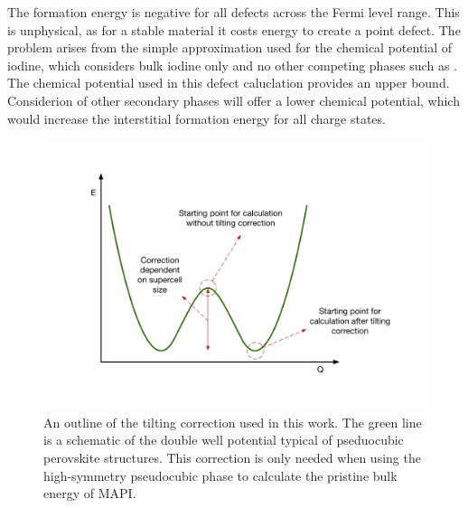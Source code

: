 The formation energy is negative for all defects across the Fermi level range. This is unphysical, as for a stable material it costs energy to create a point defect. The problem arises from the simple approximation used for the chemical potential of iodine, which considers bulk iodine only and no other competing phases such as . The chemical potential used in this defect caluclation provides an upper bound. Considerion of other secondary phases will offer a lower chemical potential, which would increase the interstitial formation energy for all charge states. 


\begin{figure}[h!]   
\centering
  \includegraphics[width=0.7\columnwidth]{figures/ch6/tilting_correction.png}
  \caption[Tilting correction for defect formation energies]{An outline of the tilting correction used in this work. The green line is a schematic of the double well potential typical of pseduocubic perovskite structures. This correction is only needed when using the high-symmetry pseudocubic phase to calculate the pristine bulk energy of MAPI.}
\label{tilting_correction}
\end{figure}

